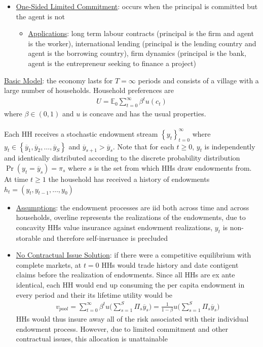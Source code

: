 \documentclass{article}
\begin{document}
\begin{itemize}
    \item  \underline{One-Sided Limited Commitment}: occurs when the principal is committed but the agent is not
    \begin{itemize}
        \item \underline{Applications}: long term labour contracts (principal is the firm and agent is the worker), international lending (principal is the lending country and agent is the borrowing country), firm dynamics (principal is the bank, agent is the entrepreneur seeking to finance a project)
    \end{itemize}
\end{itemize}
\vspace{2.5mm}
\par \underline{Basic Model}: the economy lasts for $T = \infty$ periods and consists of a village with a large number of households. Household preferences are
\begin{gather*}
    U = \mathbb{E}_{0} \sum_{t = 0}^{\infty} \beta^{t} u(c_{t})
\end{gather*}
where $\beta \in (0, 1)$ and $u$ is concave and has the usual properties. \\ \\ Each HH receives a stochastic endowment stream $\left\{y_{t}\right\}_{t=0}^{\infty}$ where $y_{t} \in \left\{ \overline{y}_{1}, \overline{y}_{2}, \dots, \overline{y}_{S} \right\}$ and $\overline{y}_{s+1} > \overline{y}_{s}$. Note that for each $t \geq 0$, $y_{t}$ is independently and identically distributed according to the discrete probability distribution $\Pr(y_{t} = \overline{y}_{s}) = \pi_{s}$ where $s$ is the set from which HHs draw endowments from. At time $t\geq 1$ the household has received a history of endowments $h_{t} = (y_{t}, y_{t-1}, \dots, y_{0})$ \\
\begin{itemize}
    \item \underline{Assumptions}: the endowment processes are iid both across time and across households, overline represents the realizations of the endowments, due to concavity HHs value insurance against endowment realizations, $y_{t}$ is non-storable and therefore self-insruance is precluded
    \item \underline{No Contractual Issue Solution}: if there were a competitive equilibrium with complete markets, at $t=0$ HHs would trade history and date contigent claims before the realization of endowments. Since all HHs are ex ante identical, each HH would end up consuming the per capita endowment in every period and their its lifetime utility would be
    \begin{gather*}
        v_{pool} = \sum_{t=0}^{\infty} \beta^{t} u \Big( \sum_{s=1}^{S} \Pi_{s} \overline{y}_{s} \Big) = \frac{1}{1-\beta} u \Big( \sum_{s=1}^{S} \Pi_{s}\overline{y}_{s} \Big)
    \end{gather*}
    HHs would thus insure away all of the risk associated with their individual endowment process. However, due to limited commitment and other contractual issues, this allocation is unattainable
\end{itemize}
\end{document}
